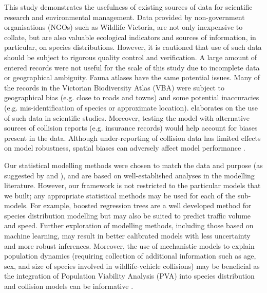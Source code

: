 This study demonstrates the usefulness of existing sources of data for scientific research and environmental management. Data provided by non-government organisations (NGOs) such as Wildlife Victoria, are not only inexpensive to collate, but are also valuable ecological indicators and sources of information, in particular, on species distributions. However, it is cautioned that use of such data should be subject to rigorous quality control and verification. A large amount of entered records were not useful for the scale of this study due to incomplete data or geographical ambiguity. Fauna atlases have the same potential issues. Many of the records in the Victorian Biodiversity Atlas (VBA) were subject to geographical bias (e.g. close to roads and towns) and some potential inaccuracies (e.g. mis-identification of species or approximate location). \cite{grah04} elaborates on the use of such data in scientific studies. Moreover, testing the model with alternative sources of collision reports (e.g. insurance records) would help account for biases present in the data. Although under-reporting of collision data has limited effects on model robustness, spatial biases can adversely affect model performance \citep{snow15}.

Our statistical modelling methods were chosen to match the data and purpose (as suggested by \cite{wint05} and \cite{guil15}), and are based on well-established analyses in the modelling literature. However, our framework is not restricted to the particular models that we built; any appropriate statistical methods may be used for each of the sub-models. For example, boosted regression trees are a well developed method for species distribution modelling \citep{elit08} but may also be suited to predict traffic volume and speed. Further exploration of modelling methods, including those based on machine learning, may result in better calibrated models with less uncertainty and more robust inferences. Moreover, the use of mechanistic models to explain population dynamics (requiring collection of additional information such as age, sex, and size of species involved in wildlife-vehicle collisions) may be beneficial as the integration of Population Viability Analysis (PVA) into species distribution and collision models can be informative \citep{tyre01,elit10,pola14}.

